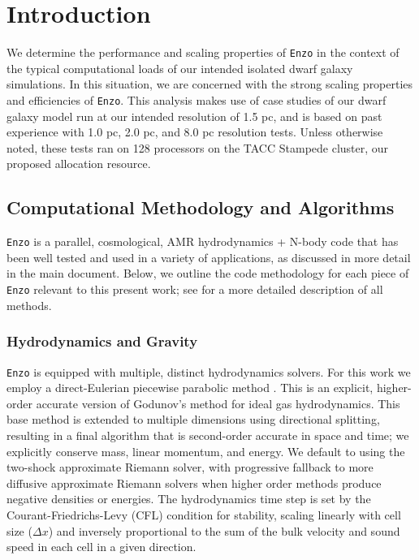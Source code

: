 \documentclass[11pt]{article}
\begin{document}
\section{Introduction}

We determine the performance and scaling properties of \texttt{Enzo} in the context of the typical computational loads of our intended isolated dwarf galaxy simulations. In this situation, we are concerned with the strong scaling properties and efficiencies of \texttt{Enzo}. This analysis makes use of case studies of our dwarf galaxy model run at our intended resolution of 1.5 pc, and is based on past experience with 1.0 pc, 2.0 pc, and 8.0 pc resolution tests. Unless otherwise noted, these tests ran on 128 processors on the TACC Stampede cluster, our proposed allocation resource.

\subsection{Computational Methodology and Algorithms}

\texttt{Enzo} is a parallel, cosmological, AMR hydrodynamics + N-body code that has been well tested and used in a variety of applications, as discussed in more detail in the main document. Below, we outline the code methodology for each piece of \texttt{Enzo} relevant to this present work; see \cite{Enzo2014} for a more detailed description of all methods. 

\subsubsection{Hydrodynamics and Gravity}

\texttt{Enzo} is equipped with multiple, distinct hydrodynamics solvers. For this work we employ a direct-Eulerian piecewise parabolic method \citep{ColellaWoodward1984, Bryan1995}. This is an explicit, higher-order accurate version of Godunov's method for ideal gas hydrodynamics. This base method is extended to multiple dimensions using directional splitting, resulting in a final algorithm that is second-order accurate in space and time; we explicitly conserve mass, linear momentum, and energy. We default to using the two-shock approximate Riemann solver, with progressive fallback to more diffusive approximate Riemann solvers when higher order methods produce negative densities or energies. The hydrodynamics time step is set by the Courant-Friedrichs-Levy (CFL) condition for stability, scaling linearly with cell size ($\Delta x$) and inversely proportional to the sum of the bulk velocity and sound speed in each cell in a given direction. 
\end{document}
